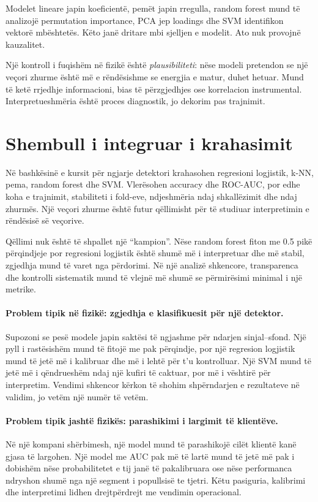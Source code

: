\documentclass[12pt,a4paper,oneside]{book}
\begin{document}
Modelet lineare japin koeficientë, pemët japin rregulla, random forest mund të analizojë permutation importance, PCA jep loadings dhe SVM identifikon vektorë mbështetës. Këto janë dritare mbi sjelljen e modelit. Ato nuk provojnë kauzalitet.

Një kontroll i fuqishëm në fizikë është \emph{plausibiliteti}: nëse modeli pretendon se një veçori zhurme është më e rëndësishme se energjia e matur, duhet hetuar. Mund të ketë rrjedhje informacioni, bias të përzgjedhjes ose korrelacion instrumental. Interpretueshmëria është proces diagnostik, jo dekorim pas trajnimit.

\section{Shembull i integruar i krahasimit}

Në bashkësinë e kursit për ngjarje detektori krahasohen regresioni logjistik, k-NN, pema, random forest dhe SVM. Vlerësohen accuracy dhe ROC-AUC, por edhe koha e trajnimit, stabiliteti i fold-eve, ndjeshmëria ndaj shkallëzimit dhe ndaj zhurmës. Një veçori zhurme është futur qëllimisht për të studiuar interpretimin e rëndësisë së veçorive.

Qëllimi nuk është të shpallet një ``kampion''. Nëse random forest fiton me 0.5 pikë përqindjeje por regresioni logjistik është shumë më i interpretuar dhe më stabil, zgjedhja mund të varet nga përdorimi. Në një analizë shkencore, transparenca dhe kontrolli sistematik mund të vlejnë më shumë se përmirësimi minimal i një metrike.


\paragraph{Problem tipik në fizikë: zgjedhja e klasifikuesit për një detektor.}
Supozoni se pesë modele japin saktësi të ngjashme për ndarjen sinjal--sfond. Një pyll i rastësishëm mund të fitojë me pak përqindje, por një regresion logjistik mund të jetë më i kalibruar dhe më i lehtë për t'u kontrolluar. Një SVM mund të jetë më i qëndrueshëm ndaj një kufiri të caktuar, por më i vështirë për interpretim. Vendimi shkencor kërkon të shohim shpërndarjen e rezultateve në validim, jo vetëm një numër të vetëm.

\paragraph{Problem tipik jashtë fizikës: parashikimi i largimit të klientëve.}
Në një kompani shërbimesh, një model mund të parashikojë cilët klientë kanë gjasa të largohen. Një model me AUC pak më të lartë mund të jetë më pak i dobishëm nëse probabilitetet e tij janë të pakalibruara ose nëse performanca ndryshon shumë nga një segment i popullsisë te tjetri. Këtu pasiguria, kalibrimi dhe interpretimi lidhen drejtpërdrejt me vendimin operacional.
\end{document}
